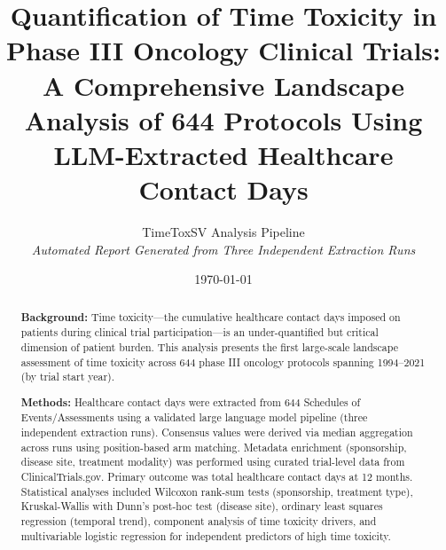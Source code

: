 \documentclass[11pt,a4paper]{article}
\title{
    \textbf{Quantification of Time Toxicity in Phase III Oncology Clinical Trials:} \\[0.5em]
    \large A Comprehensive Landscape Analysis of 644 Protocols Using \\
    LLM-Extracted Healthcare Contact Days
}
\author{
    TimeToxSV Analysis Pipeline \\
    \textit{Automated Report Generated from Three Independent Extraction Runs}
}
\date{\today}
\begin{document}
\maketitle

\begin{abstract}
\noindent\textbf{Background:} Time toxicity---the cumulative healthcare contact days imposed on patients during clinical trial participation---is an under-quantified but critical dimension of patient burden. This analysis presents the first large-scale landscape assessment of time toxicity across 644 phase III oncology protocols spanning 1994--2021 (by trial start year).

\noindent\textbf{Methods:} Healthcare contact days were extracted from 644 Schedules of Events/Assessments using a validated large language model pipeline (three independent extraction runs). Consensus values were derived via median aggregation across runs using position-based arm matching. Metadata enrichment (sponsorship, disease site, treatment modality) was performed using curated trial-level data from ClinicalTrials.gov. Primary outcome was total healthcare contact days at 12 months. Statistical analyses included Wilcoxon rank-sum tests (sponsorship, treatment type), Kruskal-Wallis with Dunn's post-hoc test (disease site), ordinary least squares regression (temporal trend), component analysis of time toxicity drivers, and multivariable logistic regression for independent predictors of high time toxicity.


\end{abstract}
\end{document}
